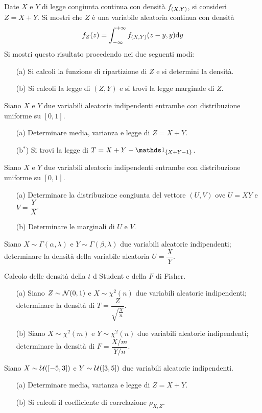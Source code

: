 \Esercizio{}
Date $X$ e $Y$ di legge congiunta continua con densità $f_{(X,Y)}$, si consideri $Z=X+Y$. Si mostri che $Z$ è una variabile aleatoria continua con densità
\[
f_Z(z)=\int_{-\infty}^{+\infty} f_{(X,Y)}(z-y,y)\mathrm{d} y
\]
Si mostri questo risultato procedendo nei due seguenti modi:
\begin{enumerate}
\item [(a)] Si calcoli la funzione di ripartizione di $Z$ e si determini la densità.
\item [(b)] Si calcoli la legge di $(Z,Y)$ e si trovi la legge marginale di $Z$.
\end{enumerate}

\Esercizio{}
Siano $X$ e $Y$ due variabili aleatorie indipendenti entrambe con distribuzione uniforme su $[0,1]$.
\begin{enumerate}
\item [(a)] Determinare media, varianza e legge di $Z=X+Y$.
\item [(b$^*$)] Si trovi la legge di $T=X+Y-\Ind_{\{ X+Y-1 \}}$.
\end{enumerate}

\Esercizio{}
Siano $X$ e $Y$ due variabili aleatorie indipendenti entrambe con distribuzione uniforme su $[0,1]$.
\begin{enumerate}
\item [(a)] Determinare la distribuzione congiunta del vettore $(U,V)$ ove $U=XY$ e $V=\dfrac{Y}{X}$.
\item [(b)] Determinare le marginali di $U$ e $V$.
\end{enumerate}

\Esercizio{}
Siano $X\sim\Gamma(\alpha,\lambda)$ e $Y\sim\Gamma(\beta,\lambda)$ due variabili aleatorie indipendenti; determinare la densità della variabile aleatoria $U=\dfrac{X}{Y}$.

\Esercizio{} %
Calcolo delle densità della $t$ d Student e della $F$ di Fisher.
\begin{enumerate}
\item [(a)] Siano $Z\sim\mathcal{N}(0,1)$ e $X\sim\chi^2(n)$ due variabili aleatorie indipendenti; determinare la densità di $T=\dfrac{Z}{\sqrt{\frac{X}{n}}}$.
\item [(b)] Siano $X\sim\chi^2(m)$ e $Y\sim\chi^2(n)$ due variabili aleatorie indipendenti; determinare la densità di $F=\dfrac{X/m}{Y/n}$.
\end{enumerate}

\Esercizio{} %
Siano $X\sim\mathcal{U}([-5,3])$ e $Y\sim\mathcal{U}([3,5])$ due variabili aleatorie indipendenti.
\begin{enumerate}
\item [(a)] Determinare media, varianza e legge di $Z=X+Y$.
\item [(b)] Si calcoli il coefficiente di correlazione $\rho_{X,Z}$.
\end{enumerate}

